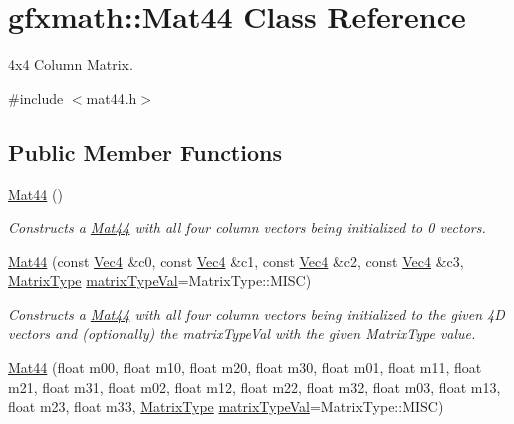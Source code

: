 \hypertarget{classgfxmath_1_1_mat44}{}\section{gfxmath\+:\+:Mat44 Class Reference}
\label{classgfxmath_1_1_mat44}


4x4 Column Matrix.  




{\ttfamily \#include $<$mat44.\+h$>$}

\subsection*{Public Member Functions}
\begin{DoxyCompactItemize}
\item 
\hyperlink{classgfxmath_1_1_mat44_a5aa0634a6c95cfae7b4680777c625294}{Mat44} ()
\begin{DoxyCompactList}\small\item\em Constructs a \hyperlink{classgfxmath_1_1_mat44}{Mat44} with all four column vectors being initialized to 0 vectors. \end{DoxyCompactList}\item 
\hyperlink{classgfxmath_1_1_mat44_a1e96437c9bcc0cc851bf55d25e9f1bc3}{Mat44} (const \hyperlink{classgfxmath_1_1_vec4}{Vec4} \&c0, const \hyperlink{classgfxmath_1_1_vec4}{Vec4} \&c1, const \hyperlink{classgfxmath_1_1_vec4}{Vec4} \&c2, const \hyperlink{classgfxmath_1_1_vec4}{Vec4} \&c3, \hyperlink{group___s_i_s_d_mat_math_ga6c8951c82aec5015dd6806affb4c8d03}{Matrix\+Type} \hyperlink{classgfxmath_1_1_mat44_a523cda94e6f5b2df5276d821b3471605}{matrix\+Type\+Val}=Matrix\+Type\+::\+M\+I\+S\+C)
\begin{DoxyCompactList}\small\item\em Constructs a \hyperlink{classgfxmath_1_1_mat44}{Mat44} with all four column vectors being initialized to the given 4\+D vectors and (optionally) the matrix\+Type\+Val with the given Matrix\+Type value. \end{DoxyCompactList}\item 
\hyperlink{classgfxmath_1_1_mat44_a72333b57344418b1a2e2563134bc2b52}{Mat44} (float m00, float m10, float m20, float m30, float m01, float m11, float m21, float m31, float m02, float m12, float m22, float m32, float m03, float m13, float m23, float m33, \hyperlink{group___s_i_s_d_mat_math_ga6c8951c82aec5015dd6806affb4c8d03}{Matrix\+Type} \hyperlink{classgfxmath_1_1_mat44_a523cda94e6f5b2df5276d821b3471605}{matrix\+Type\+Val}=Matrix\+Type\+::\+M\+I\+S\+C)

\end{DoxyCompactItemize}

